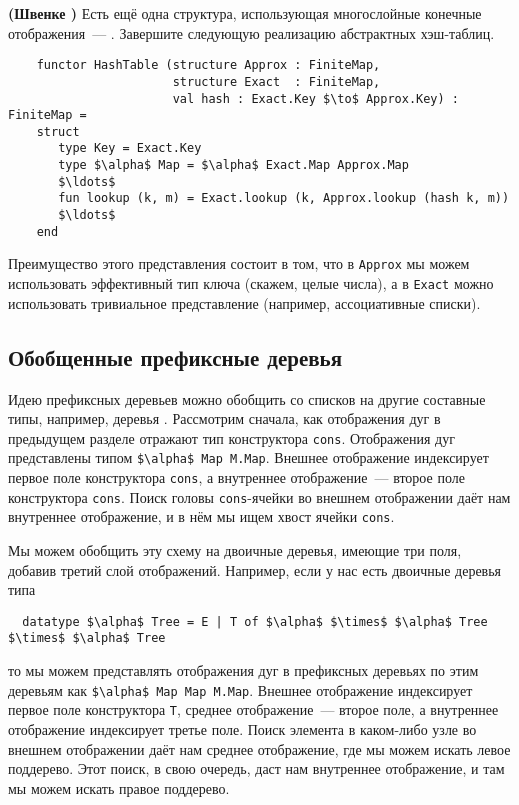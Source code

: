 \begin{exercise}\label{ex:10.11}
  \textbf{(Швенке \cite{Schwenke1997})} Есть ещё одна структура,
  использующая многослойные конечные отображения~---
  . Завершите следующую реализацию
  абстрактных хэш-таблиц.
  \begin{lstlisting}
    functor HashTable (structure Approx : FiniteMap,
                       structure Exact  : FiniteMap,
                       val hash : Exact.Key $\to$ Approx.Key) : FiniteMap =
    struct
       type Key = Exact.Key
       type $\alpha$ Map = $\alpha$ Exact.Map Approx.Map
       $\ldots$
       fun lookup (k, m) = Exact.lookup (k, Approx.lookup (hash k, m))
       $\ldots$
    end
  \end{lstlisting}
  Преимущество этого представления состоит в том, что в
  \lstinline!Approx! мы можем использовать эффективный тип ключа
  (скажем, целые числа), а в \lstinline!Exact! можно использовать
  тривиальное представление (например, ассоциативные списки).
\end{exercise}

\subsection{Обобщенные префиксные деревья}
\label{sc:10.3.2}

Идею префиксных деревьев можно обобщить со списков на другие составные типы,
например, деревья \cite{ConnellyMorris1995}. Рассмотрим
сначала, как отображения дуг в предыдущем разделе отражают тип
конструктора \lstinline!cons!. Отображения дуг представлены типом
\lstinline!$\alpha$ Map M.Map!. Внешнее отображение индексирует первое
поле конструктора \lstinline!cons!, а внутреннее отображение~--- второе
поле конструктора \lstinline!cons!. Поиск головы
\lstinline!cons!-ячейки во внешнем отображении даёт нам внутреннее
отображение, и в нём мы ищем хвост ячейки \lstinline!cons!.

Мы можем обобщить эту схему на двоичные деревья, имеющие три поля,
добавив третий слой отображений. Например, если у нас есть двоичные деревья
типа
\begin{lstlisting}
  datatype $\alpha$ Tree = E | T of $\alpha$ $\times$ $\alpha$ Tree $\times$ $\alpha$ Tree
\end{lstlisting}
то мы можем представлять отображения дуг в префиксных деревьях по этим
деревьям как \lstinline!$\alpha$ Map Map M.Map!. Внешнее отображение
индексирует первое поле конструктора \lstinline!T!, среднее
отображение~--- второе поле, а внутреннее отображение индексирует
третье поле. Поиск элемента в каком-либо узле во внешнем отображении
даёт нам среднее отображение, где мы можем искать левое
поддерево. Этот поиск, в свою очередь, даст нам внутреннее
отображение, и там мы можем искать правое поддерево.


